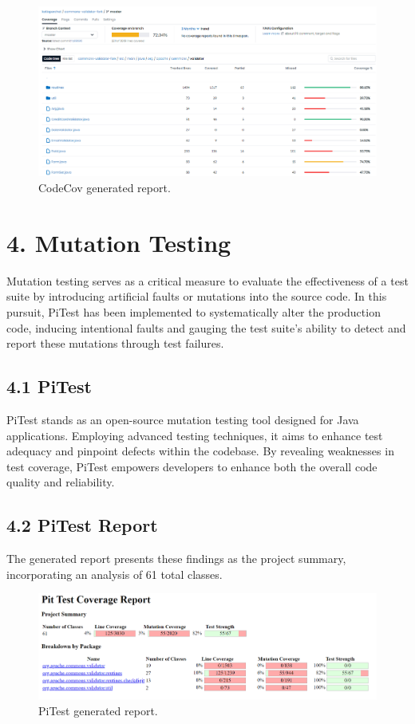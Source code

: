 \documentclass{sigchi}
\begin{document}
\begin{figure}[h!]
    \centering
    \includegraphics[width=1\columnwidth]{codecov.png}
    \caption{CodeCov generated report.}
    \label{fig:enter-label}
\end{figure}

\section{4. Mutation Testing}
Mutation testing serves as a critical measure to evaluate the effectiveness of a test suite by introducing artificial faults or mutations into the source code. In this pursuit, PiTest has been implemented to systematically alter the production code, inducing intentional faults and gauging the test suite's ability to detect and report these mutations through test failures.

\subsection{4.1 PiTest}
PiTest \cite{pitest} stands as an open-source mutation testing tool designed for Java applications. Employing advanced testing techniques, it aims to enhance test adequacy and pinpoint defects within the codebase. By revealing weaknesses in test coverage, PiTest empowers developers to enhance both the overall code quality and reliability. 

\subsection{4.2 PiTest Report}
The generated report presents these findings as the project summary, incorporating an analysis of 61 total classes.

\begin{figure}[h!]
    \centering
    \includegraphics[width=1\columnwidth]{pitest1.png}
    \caption{PiTest generated report.}
    \label{fig:enter-label}
\end{figure}
\end{document}
